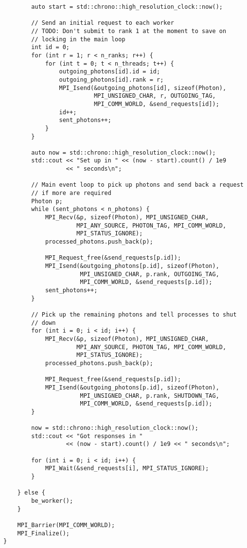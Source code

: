 \begin{lstlisting}
        auto start = std::chrono::high_resolution_clock::now();

        // Send an initial request to each worker
        // TODO: Don't submit to rank 1 at the moment to save on
        // locking in the main loop
        int id = 0;
        for (int r = 1; r < n_ranks; r++) {
            for (int t = 0; t < n_threads; t++) {
                outgoing_photons[id].id = id;
                outgoing_photons[id].rank = r;
                MPI_Isend(&outgoing_photons[id], sizeof(Photon),
                          MPI_UNSIGNED_CHAR, r, OUTGOING_TAG,
                          MPI_COMM_WORLD, &send_requests[id]);
                id++;
                sent_photons++;
            }
        }

        auto now = std::chrono::high_resolution_clock::now();
        std::cout << "Set up in " << (now - start).count() / 1e9
                  << " seconds\n";

        // Main event loop to pick up photons and send back a request
        // if more are required
        Photon p;
        while (sent_photons < n_photons) {
            MPI_Recv(&p, sizeof(Photon), MPI_UNSIGNED_CHAR,
                     MPI_ANY_SOURCE, PHOTON_TAG, MPI_COMM_WORLD,
                     MPI_STATUS_IGNORE);
            processed_photons.push_back(p);

            MPI_Request_free(&send_requests[p.id]);
            MPI_Isend(&outgoing_photons[p.id], sizeof(Photon),
                      MPI_UNSIGNED_CHAR, p.rank, OUTGOING_TAG,
                      MPI_COMM_WORLD, &send_requests[p.id]);
            sent_photons++;
        }

        // Pick up the remaining photons and tell processes to shut
        // down
        for (int i = 0; i < id; i++) {
            MPI_Recv(&p, sizeof(Photon), MPI_UNSIGNED_CHAR,
                     MPI_ANY_SOURCE, PHOTON_TAG, MPI_COMM_WORLD,
                     MPI_STATUS_IGNORE);
            processed_photons.push_back(p);

            MPI_Request_free(&send_requests[p.id]);
            MPI_Isend(&outgoing_photons[p.id], sizeof(Photon),
                      MPI_UNSIGNED_CHAR, p.rank, SHUTDOWN_TAG,
                      MPI_COMM_WORLD, &send_requests[p.id]);
        }

        now = std::chrono::high_resolution_clock::now();
        std::cout << "Got responses in "
                  << (now - start).count() / 1e9 << " seconds\n";

        for (int i = 0; i < id; i++) {
            MPI_Wait(&send_requests[i], MPI_STATUS_IGNORE);
        }

    } else {
        be_worker();
    }

    MPI_Barrier(MPI_COMM_WORLD);
    MPI_Finalize();
}
\end{lstlisting}
